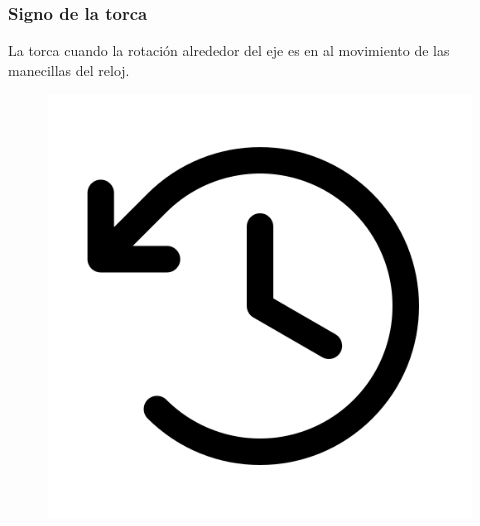 \documentclass[14pt]{beamer}
\begin{document}
\begin{frame}
\frametitle{Signo de la torca}
La torca  cuando la rotación alrededor del eje es en  al movimiento de las manecillas del reloj.
\begin{figure}
    \centering
    \includegraphics[scale=0.18]{Imagenes/DominaBach_05.png}
\end{figure}
\end{frame}
\end{document}
